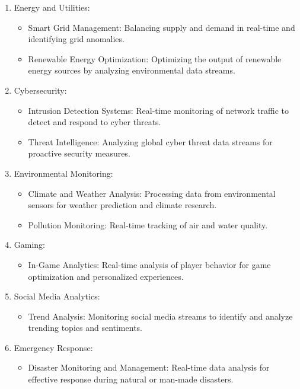 \documentclass[11pt, reqno]{amsart}
\theoremstyle{definition}
\theoremstyle{remark}
\begin{document}
\begin{enumerate}
    \item Energy and Utilities:
      \begin{itemize}
        \item Smart Grid Management: Balancing supply and demand in real-time
          and identifying grid anomalies.

        \item Renewable Energy Optimization: Optimizing the output of renewable
          energy sources by analyzing environmental data streams.
      \end{itemize}

    \item Cybersecurity:
      \begin{itemize}
        \item Intrusion Detection Systems: Real-time monitoring of network
          traffic to detect and respond to cyber threats.

        \item Threat Intelligence: Analyzing global cyber threat data streams
          for proactive security measures.
      \end{itemize}

    \item Environmental Monitoring:
      \begin{itemize}
        \item Climate and Weather Analysis: Processing data from environmental
          sensors for weather prediction and climate research.

        \item Pollution Monitoring: Real-time tracking of air and water quality.
      \end{itemize}

    \item Gaming:
      \begin{itemize}
        \item In-Game Analytics: Real-time analysis of player behavior for game
          optimization and personalized experiences.
      \end{itemize}

    \item Social Media Analytics:
      \begin{itemize}
        \item Trend Analysis: Monitoring social media streams to identify and
          analyze trending topics and sentiments.
      \end{itemize}

    \item Emergency Response:
      \begin{itemize}
        \item Disaster Monitoring and Management: Real-time data analysis for
          effective response during natural or man-made disasters.
      \end{itemize}
  \end{enumerate}
\end{document}

